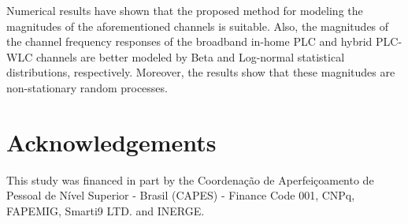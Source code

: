 \documentclass[journal]{IEEEtran}
\begin{document}
Numerical results have shown that the proposed method for modeling the magnitudes of the aforementioned channels is suitable. Also, the magnitudes of the channel frequency responses of the broadband in-home \ac{PLC} and hybrid \ac{PLC}-\ac{WLC} channels are better modeled by Beta and Log-normal statistical distributions, respectively. Moreover, the results show that these magnitudes are non-stationary random processes. 
 
\section*{Acknowledgements}
This study was financed in part by the Coordena\c{c}\~ao de Aperfei\c{c}oamento de Pessoal de N\'ivel Superior - Brasil (CAPES) - Finance Code 001, CNPq, FAPEMIG, Smarti9 LTD. and INERGE.



\end{document}
